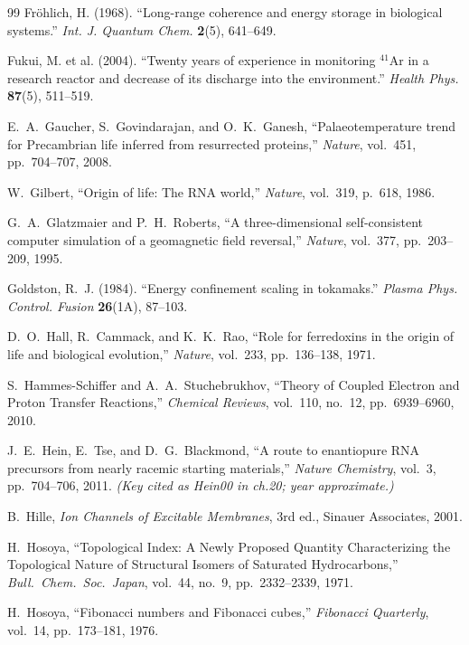 \documentclass[12pt,oneside]{book}
\begin{document}
\begin{thebibliography}{99}
Fr\"ohlich, H. (1968).
``Long-range coherence and energy storage in biological systems.''
\textit{Int. J. Quantum Chem.} \textbf{2}(5), 641--649.

Fukui, M. et al. (2004).
``Twenty years of experience in monitoring ${}^{41}$Ar in a research reactor and decrease of its discharge into the environment.''
\textit{Health Phys.} \textbf{87}(5), 511--519.

E.~A.~Gaucher, S.~Govindarajan, and O.~K.~Ganesh,
``Palaeotemperature trend for Precambrian life inferred from resurrected proteins,''
\emph{Nature}, vol.~451, pp.~704--707, 2008.

W.~Gilbert,
``Origin of life: The RNA world,''
\emph{Nature}, vol.~319, p.~618, 1986.

G.~A.~Glatzmaier and P.~H.~Roberts,
``A three-dimensional self-consistent computer simulation of a geomagnetic field reversal,''
\emph{Nature}, vol.~377, pp.~203--209, 1995.

Goldston, R.~J. (1984).
``Energy confinement scaling in tokamaks.''
\textit{Plasma Phys. Control. Fusion} \textbf{26}(1A), 87--103.

D.~O.~Hall, R.~Cammack, and K.~K.~Rao,
``Role for ferredoxins in the origin of life and biological evolution,''
\emph{Nature}, vol.~233, pp.~136--138, 1971.

S.~Hammes-Schiffer and A.~A.~Stuchebrukhov,
``Theory of Coupled Electron and Proton Transfer Reactions,''
\emph{Chemical Reviews}, vol.~110, no.~12, pp.~6939--6960, 2010.

J.~E.~Hein, E.~Tse, and D.~G.~Blackmond,
``A route to enantiopure RNA precursors from nearly racemic starting materials,''
\emph{Nature Chemistry}, vol.~3, pp.~704--706, 2011.
\textit{(Key cited as Hein00 in ch.20; year approximate.)}

B.~Hille,
\emph{Ion Channels of Excitable Membranes},
3rd ed., Sinauer Associates, 2001.

H.~Hosoya,
``Topological Index: A Newly Proposed Quantity Characterizing the Topological Nature of Structural Isomers of Saturated Hydrocarbons,''
\emph{Bull.\ Chem.\ Soc.\ Japan}, vol.~44, no.~9, pp.~2332--2339, 1971.

H.~Hosoya,
``Fibonacci numbers and Fibonacci cubes,''
\emph{Fibonacci Quarterly}, vol.~14, pp.~173--181, 1976.


\end{thebibliography}
\end{document}

